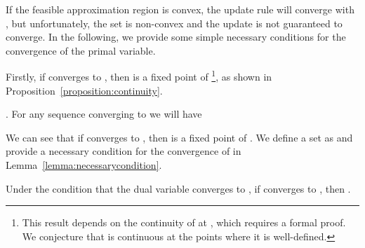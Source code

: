If the feasible approximation region is convex, the update rule will converge with , but unfortunately, the set  is non-convex and the update is not guaranteed to converge. In the following, we provide some simple necessary conditions for the convergence of the primal variable.
\iffalse
\paragaph{A \textit{trivial} Sufficient Condition}

A trivial sufficient condition for the convergence of  is given in Proposition~\ref{proposition:contractmapping}

\begin{proposition}\label{proposition:contractmapping}
If the function  is a contractive mapping, then it has a fixed point  and the  update will converge to .
\end{proposition}

This proposition can be proved by the Banach fixed point theorem. However, this sufficient condition is not so useful because it is difficult to guarantee or even check whether  is contractive or not. Moreover, the author believes that this condition is hard to satisfy because this function is inherently doing projection onto a non-convex set, which is non-contractive \footnote{On the other hand, if we are doing projection onto a convex set, we will be sure that the function is strictly contractive and the update will converge.}.

\subsubsection{A \textit{useful} Necessary Condition}
\fi
Firstly, if  converges to , then  is a fixed point of  \footnote{This result depends on the continuity of  at , which requires a formal proof. We conjecture that  is continuous at the points where it is well-defined.}, as shown in Proposition~\ref{proposition:continuity}.

\begin{proposition}\label{proposition:continuity}.
For any sequence  converging to  we will have

\end{proposition}



We can see that if  converges to , then  is a fixed point of . We define a set  as 
and provide a necessary condition for the convergence of  in Lemma~\ref{lemma:necessarycondition}.

\begin{lemma}\label{lemma:necessarycondition}
Under the condition that the dual variable  converges to , if  converges to , then .
\end{lemma}


